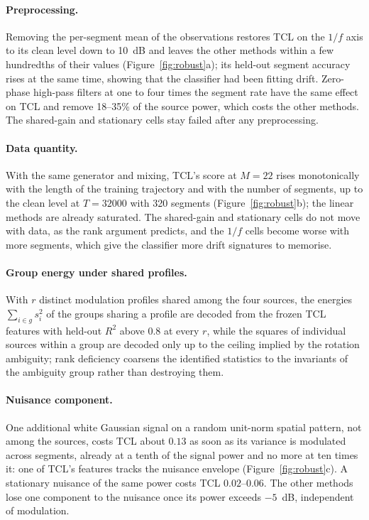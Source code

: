 \paragraph{Preprocessing.}
Removing the per-segment mean of the observations restores TCL on the $1/f$ axis to its clean level down to 10~dB and leaves the other methods within a few hundredths of their values (Figure~\ref{fig:robust}a); its held-out segment accuracy rises at the same time, showing that the classifier had been fitting drift.
Zero-phase high-pass filters at one to four times the segment rate have the same effect on TCL and remove 18--35\% of the source power, which costs the other methods.
The shared-gain and stationary cells stay failed after any preprocessing.

\paragraph{Data quantity.}
With the same generator and mixing, TCL's score at $M = 22$ rises monotonically with the length of the training trajectory and with the number of segments, up to the clean level at $T = 32000$ with 320 segments (Figure~\ref{fig:robust}b); the linear methods are already saturated.
The shared-gain and stationary cells do not move with data, as the rank argument predicts, and the $1/f$ cells become worse with more segments, which give the classifier more drift signatures to memorise.

\paragraph{Group energy under shared profiles.}
With $r$ distinct modulation profiles shared among the four sources, the energies $\sum_{i \in g} s_i^2$ of the groups sharing a profile are decoded from the frozen TCL features with held-out $R^2$ above $0.8$ at every $r$, while the squares of individual sources within a group are decoded only up to the ceiling implied by the rotation ambiguity; rank deficiency coarsens the identified statistics to the invariants of the ambiguity group rather than destroying them.

\paragraph{Nuisance component.}
One additional white Gaussian signal on a random unit-norm spatial pattern, not among the sources, costs TCL about $0.13$ as soon as its variance is modulated across segments, already at a tenth of the signal power and no more at ten times it: one of TCL's features tracks the nuisance envelope (Figure~\ref{fig:robust}c).
A stationary nuisance of the same power costs TCL $0.02$--$0.06$.
The other methods lose one component to the nuisance once its power exceeds $-5$~dB, independent of modulation.

